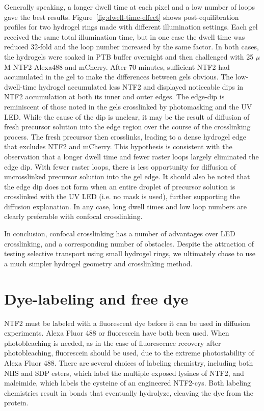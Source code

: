 Generally speaking, a longer dwell time at each pixel and a low number of loops gave the best results.  %
 Figure~\ref{fig:dwell-time-effect} shows post-equilibration profiles for two hydrogel rings made with different illumination settings.  Each gel received the same total illumination time, but in one case the dwell time was reduced 32-fold and the loop number increased by the same factor.  In both cases, the hydrogels were soaked in PTB buffer overnight and then challenged with 25 $\mu$M NTF2-Alexa488 and mCherry.  After 70 minutes, sufficient NTF2 had accumulated in the gel to make the differences between gels obvious.  The low-dwell-time hydrogel accumulated less NTF2 and displayed noticeable dips in NTF2 accumulation at both its inner and outer edges.  The edge-dip is reminiscent of those noted in the gels crosslinked by photomasking and the UV LED.  While the cause of the dip is unclear, it may be the result of diffusion of fresh precursor solution into the edge region over the course of the crosslinking process.  The fresh precursor then crosslinks, leading to a dense hydrogel edge that excludes NTF2 and mCherry.  This hypothesis is consistent with the observation that a longer dwell time and fewer raster loops largely eliminated the edge dip.  With fewer raster loops, there is less opportunity for diffusion of uncrosslinked precursor solution into the gel edge.  It should also be noted that the edge dip does not form when an entire droplet of precursor solution is crosslinked with the UV LED (i.e. no mask is used), further supporting the diffusion explanation.  In any case, long dwell times and low loop numbers are clearly preferable with confocal crosslinking.

In conclusion, confocal crosslinking has a number of advantages over LED crosslinking, and a corresponding number of obstacles.  Despite the attraction of testing selective transport using small hydrogel rings, we ultimately chose to use a much simpler hydrogel geometry and crosslinking method.

\section{Dye-labeling and free dye}
\label{sec:free-dye}

NTF2 must be labeled with a fluorescent dye before it can be used in diffusion experiments.  Alexa Fluor 488 or fluorescein have both been used.  When photobleaching is needed, as in the case of fluorescence recovery after photobleaching, fluorescein should be used, due to the extreme photostability of Alexa Fluor 488.  There are several choices of labeling chemistry, including both NHS and SDP esters, which label the multiple exposed lysines of NTF2, and maleimide, which labels the cysteine of an engineered NTF2-cys.  Both labeling chemistries result in bonds that eventually hydrolyze, cleaving the dye from the protein. 

